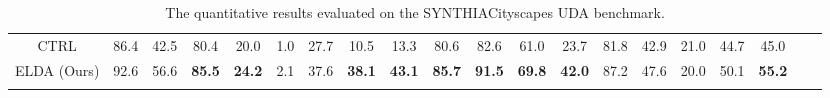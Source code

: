 \documentclass{bmvc2k}
\begin{document}
\begin{table*}[t]
{\begin{tabular}{llllllllllllllllllll}
\multicolumn{1}{c|}{CTRL\cite{Saha_2021_CVPR_CTRL}} & \multicolumn{1}{c}{86.4} & \multicolumn{1}{c}{42.5} & \multicolumn{1}{c}{80.4} & \multicolumn{1}{c}{20.0} & \multicolumn{1}{c}{1.0} & \multicolumn{1}{c}{27.7} & \multicolumn{1}{c}{10.5} & \multicolumn{1}{c}{13.3} & \multicolumn{1}{c}{80.6} & \multicolumn{1}{c}{82.6} & \multicolumn{1}{c}{61.0} & \multicolumn{1}{c}{23.7} & \multicolumn{1}{c}{81.8} & \multicolumn{1}{c}{42.9} & \multicolumn{1}{c}{21.0} & \multicolumn{1}{c|}{44.7} &  \multicolumn{1}{c}{45.0} \\
\multicolumn{1}{c|}{ELDA (Ours)} & \multicolumn{1}{c}{92.6} & \multicolumn{1}{c}{56.6} & \multicolumn{1}{c}{\textbf{85.5}} & \multicolumn{1}{c}{\textbf{24.2}} & \multicolumn{1}{c}{2.1} & \multicolumn{1}{c}{37.6} & \multicolumn{1}{c}{\textbf{38.1}} & \multicolumn{1}{c}{\textbf{43.1}} & \multicolumn{1}{c}{\textbf{85.7}} & \multicolumn{1}{c}{\textbf{91.5}} & \multicolumn{1}{c}{\textbf{69.8}} & \multicolumn{1}{c}{\textbf{42.0}} & \multicolumn{1}{c}{87.2} & \multicolumn{1}{c}{47.6} & \multicolumn{1}{c}{20.0} & \multicolumn{1}{c|}{50.1} & \multicolumn{1}{c}{\textbf{55.2}} \\
\mytoprule
\end{tabular}}
\caption{The quantitative results evaluated on the SYNTHIACityscapes UDA benchmark.}
\label{tab:syn_benchmark}
\end{table*} 
\end{document}
